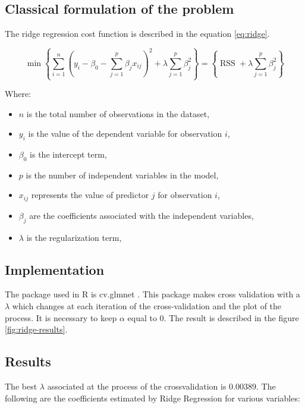 \documentclass[10pt]{article} %
\begin{document}
    \subsection{Classical formulation of the problem}
    The ridge regression cost function \cite{james2013chapter6-2-1} is described in the equation \ref{eq:ridge}.

    \begin{equation}
        \min \left\{\sum_{i=1}^n\left(y_i-\beta_0-\sum_{j=1}^p \beta_j x_{i j}\right)^2+\lambda \sum_{j=1}^p \beta_j^2 \right\}= \left\{\operatorname{RSS}+\lambda \sum_{j=1}^p \beta_j^2 \right\}
        \label{eq:ridge} 
    \end{equation}

    Where:
     \begin{itemize}
        \item $n$ is the total number of observations in the dataset,
        \item $y_i$ is the value of the dependent variable for observation $i$,
        \item $\beta_0$ is the intercept term,
        \item $p$ is the number of independent variables in the model,
        \item $x_{ij}$ represents the value of predictor $j$ for observation $i$,
        \item $\beta_j$ are the coefficients associated with the independent variables,
        \item $\lambda$ is the regularization term,
    \end{itemize}

    \subsection{Implementation}
    The package used in R is cv.glmnet \cite{glmnetwebsite}. This package makes cross validation with a $\lambda$ which changes at each iteration of the cross-validation and the plot of the process. It is necessary to keep $\alpha$ equal to 0. 
    The result is described in the figure \ref{fig:ridge-results}.

    \subsection{Results}
    The best $\lambda$ associated at the process of the crossvalidation is 0.00389.
  The following are the coefficients estimated by Ridge Regression for various variables:
\end{document}
